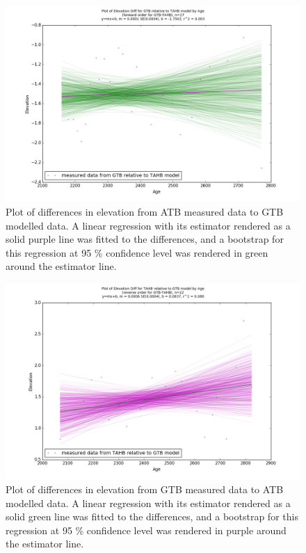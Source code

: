 \newpage

\begin{figure}[H]
	\includegraphics[width=1.3\linewidth, angle=270 ]{data/bothNonZero/withinSeventyFivePercent/gias/theGIA_GTB_relative_to_TAHB.png}
	\caption{Plot of differences in elevation from ATB measured data to GTB modelled data. A linear regression with its estimator rendered as
	 a solid purple line was fitted to the differences, and a bootstrap for this regression at 95 \% confidence level was rendered in green
	 around the estimator line.}
	\label{fig:gias_GTBxTAHB}
\end{figure}
\newpage


\begin{figure}[H]
	\includegraphics[width=1.3\linewidth, angle=270 ]{data/bothNonZero/withinSeventyFivePercent/gias/theGIA_TAHB_relative_to_GTB.png}
	\caption{Plot of differences in elevation from GTB measured data to ATB modelled data. A linear regression with its estimator rendered as
	 a solid green line was fitted to the differences, and a bootstrap for this regression at 95 \% confidence level was rendered in purple
	 around the estimator line.}
	\label{fig:gias_TAHBxGTB}
\end{figure}
\newpage




